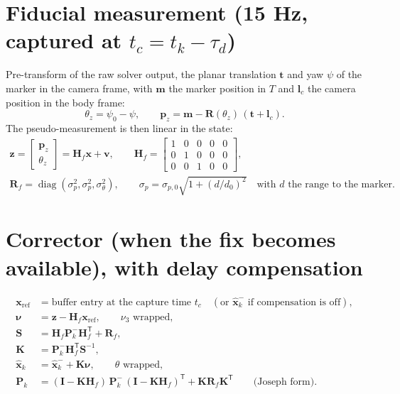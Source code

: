 \documentclass[11pt,a4paper]{article}
\newcommand{\vect}[1]{\bm{#1}}
\newcommand{\mat}[1]{\bm{#1}}
\newcommand{\T}{^{\mathsf{T}}}
\newcommand{\diag}{\operatorname{diag}}
\newcommand{\Rot}{\mat{R}}
\newcommand{\hx}{\hat{\vect{x}}}
\begin{document}
\section{Fiducial measurement (15 Hz, captured at $t_c = t_k - \tau_d$)}
Pre-transform of the raw solver output, the planar translation $\vect t$ and yaw $\psi$ of the marker in the camera frame, with $\vect m$ the marker position in $T$ and $\vect l_c$ the camera position in the body frame:
\begin{equation}
\theta_z = \psi_0 - \psi,
\qquad
\vect p_z = \vect m - \Rot(\theta_z)\,(\vect t + \vect l_c).
\end{equation}
The pseudo-measurement is then linear in the state:
\begin{gather}
\vect z = \begin{bmatrix}\vect p_z \\ \theta_z\end{bmatrix} = \mat H_f\vect x + \vect v,
\qquad
\mat H_f = \begin{bmatrix} 1 & 0 & 0 & 0 & 0 \\ 0 & 1 & 0 & 0 & 0 \\ 0 & 0 & 1 & 0 & 0 \end{bmatrix},\\
\mat R_f = \diag(\sigma_p^2,\sigma_p^2,\sigma_\theta^2),
\qquad
\sigma_p = \sigma_{p,0}\sqrt{1 + (d/d_0)^2}\quad\text{with } d \text{ the range to the marker}.
\end{gather}

\section{Corrector (when the fix becomes available), with delay compensation}
\begin{align}
\vect x_{\mathrm{ref}} &= \text{buffer entry at the capture time } t_c \quad(\text{or } \hx_k^- \text{ if compensation is off}), \\
\vect\nu &= \vect z - \mat H_f\vect x_{\mathrm{ref}}, \qquad \nu_3 \text{ wrapped}, \\
\mat S &= \mat H_f\mat P_k^-\mat H_f\T + \mat R_f, \\
\mat K &= \mat P_k^-\mat H_f\T\mat S^{-1}, \\
\hx_k &= \hx_k^- + \mat K\vect\nu, \qquad \theta \text{ wrapped}, \\
\mat P_k &= (\mat I - \mat K\mat H_f)\,\mat P_k^-\,(\mat I - \mat K\mat H_f)\T + \mat K\mat R_f\mat K\T \qquad\text{(Joseph form)}.
\end{align}
\end{document}
